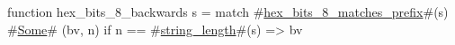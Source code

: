 function hex_bits_8_backwards s =
  match #\hyperref[sailRISCVzhexzybitszy8zymatcheszyprefix]{hex\_bits\_8\_matches\_prefix}#(s) {
      #\hyperref[sailRISCVzSome]{Some}# (bv, n) if n == #\hyperref[sailRISCVzstringzylength]{string\_length}#(s) => bv
  }
